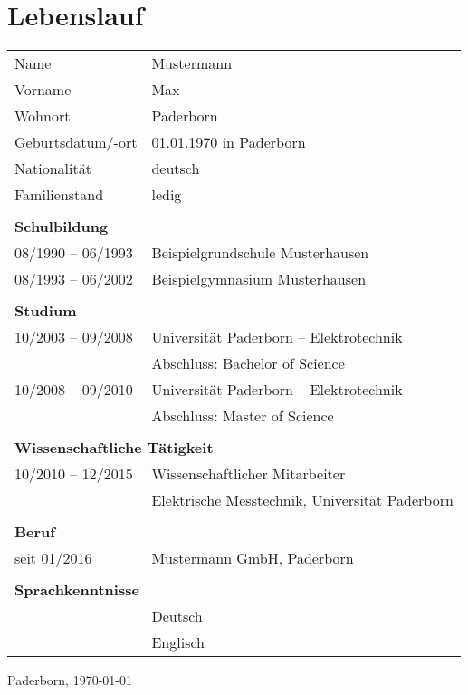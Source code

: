 \chapter{Lebenslauf}

\newcommand{\tabsection}[1]{\\ \multicolumn{2}{l}{\sffamily\bfseries #1}\\}

\begin{tabular}{ll}
    Name                & Mustermann\\
    Vorname             & Max\\
    Wohnort             & Paderborn\\
    Geburtsdatum/-ort   & 01.01.1970 in Paderborn\\
    Nationalität        & deutsch\\
    Familienstand       & ledig\\
    \tabsection{Schulbildung}
    08/1990 -- 06/1993  & Beispielgrundschule Musterhausen\\
    08/1993 -- 06/2002  & Beispielgymnasium Musterhausen\\
    \tabsection{Studium}
    10/2003 -- 09/2008  & Universität Paderborn -- Elektrotechnik\\
                        & Abschluss: Bachelor of Science\\
    10/2008 -- 09/2010  & Universität Paderborn -- Elektrotechnik\\
                        & Abschluss: Master of Science\\
    \tabsection{Wissenschaftliche Tätigkeit}
    10/2010 -- 12/2015  & Wissenschaftlicher Mitarbeiter\\
                        & Elektrische Messtechnik, Universität Paderborn\\
    \tabsection{Beruf}
    seit 01/2016        & Mustermann GmbH, Paderborn\\
    \tabsection{Sprachkenntnisse}
                        & Deutsch\\
                        & Englisch\\
\end{tabular}
\vspace{10mm}

\noindent Paderborn, \today
\vspace{10mm}
